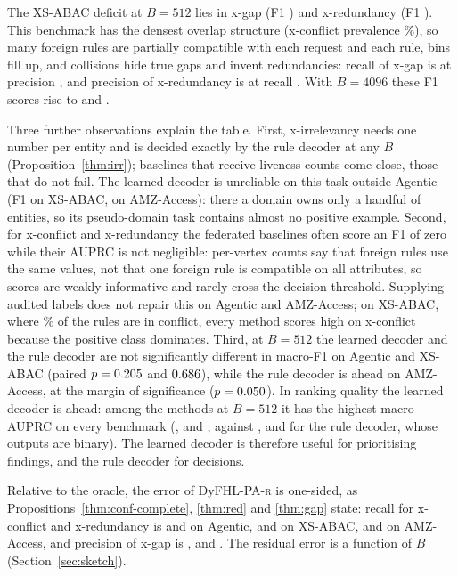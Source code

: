 \documentclass[preprint,12pt]{elsarticle}
\theoremstyle{definition}
\newcommand{\name}{DyFHL-PA\xspace}
\newcommand{\R}{\textsc{r}}
\begin{document}
The XS-ABAC deficit at $B=512$ lies in x-gap (F1 \mainxustollerRgap) and x-redundancy (F1 \mainxustollerRred). This benchmark has the densest overlap structure (x-conflict prevalence \prevxustollercon\%), so many foreign rules are partially compatible with each request and each rule, bins fill up, and collisions hide true gaps and invent redundancies: recall of x-gap is \mainxustollerRgaprec{} at precision \mainxustollerRgapprec, and precision of x-redundancy is \mainxustollerRredprec{} at recall \mainxustollerRredrec. With $B=4096$ these F1 scores rise to \mainxustollerRbiggap{} and \mainxustollerRbigred.

Three further observations explain the table. First, x-irrelevancy needs one number per entity and is decided exactly by the rule decoder at any $B$ (Proposition~\ref{thm:irr}); baselines that receive liveness counts come close, those that do not fail. The learned decoder is unreliable on this task outside Agentic (F1 \mainxustollerLirr{} on XS-ABAC, \mainamazonLirr{} on AMZ-Access): there a domain owns only a handful of entities, so its pseudo-domain task contains almost no positive example. Second, for x-conflict and x-redundancy the federated baselines often score an F1 of zero while their AUPRC is not negligible: per-vertex counts say that foreign rules use the same values, not that one foreign rule is compatible on all attributes, so scores are weakly informative and rarely cross the decision threshold. Supplying audited labels does not repair this on Agentic and AMZ-Access; on XS-ABAC, where \prevxustollercon\% of the rules are in conflict, every method scores high on x-conflict because the positive class dominates. Third, at $B=512$ the learned decoder and the rule decoder are not significantly different in macro-F1 on Agentic and XS-ABAC (paired $p=0.205$ and $0.686$), while the rule decoder is ahead on AMZ-Access, at the margin of significance ($p=0.050$). In ranking quality the learned decoder is ahead: among the methods at $B=512$ it has the highest macro-AUPRC on every benchmark (\mainagenticLap, \mainxustollerLap{} and \mainamazonLap, against \mainagenticRap, \mainxustollerRap{} and \mainamazonRap{} for the rule decoder, whose outputs are binary). The learned decoder is therefore useful for prioritising findings, and the rule decoder for decisions.

Relative to the oracle, the error of \name-\R{} is one-sided, as Propositions~\ref{thm:conf-complete}, \ref{thm:red} and \ref{thm:gap} state: recall for x-conflict and x-redundancy is \mainagenticRconrec{} and \mainagenticRredrec{} on Agentic, \mainxustollerRconrec{} and \mainxustollerRredrec{} on XS-ABAC, \mainamazonRconrec{} and \mainamazonRredrec{} on AMZ-Access, and precision of x-gap is \mainagenticRgapprec, \mainxustollerRgapprec{} and \mainamazonRgapprec. The residual error is a function of $B$ (Section~\ref{sec:sketch}).
\end{document}
